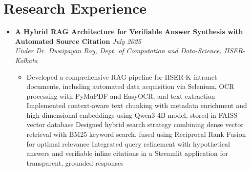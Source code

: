 \documentclass[a4paper,9pt]{article}
\newcommand{\resumeProject}[4]{
    \item\small{
        \textbf{#1} \hfill \textit{#2}\\
        \textit{#3}\\
        \begin{itemize}[leftmargin=1.5em,label=\textbullet,nosep,itemsep=0.5pt]
            #4
        \end{itemize}
    }\vspace{2pt}
}
\newcommand{\compactSection}[2]{
    \section{#1}
    \vspace{-0.1cm}
    #2
    \vspace{-0.2cm}
}
\begin{document}
\compactSection{Research Experience}{
\begin{itemize}[leftmargin=*,label={},itemsep=4pt]


    \resumeProject{A Hybrid RAG Architecture for Verifiable Answer Synthesis with Automated Source Citation}{July 2025}
    {Under Dr. Dwaipayan Roy, Dept. of Computation and Data-Science, IISER-Kolkata}
    {\item Developed a comprehensive RAG pipeline for IISER-K intranet documents, including automated data acquisition via Selenium, OCR processing with PyMuPDF and EasyOCR, and text extraction
    Implemented context-aware text chunking with metadata enrichment and high-dimensional embeddings using Qwen3-4B model, stored in FAISS vector database
     Designed hybrid search strategy combining dense vector retrieval with BM25 keyword search, fused using Reciprocal Rank Fusion for optimal relevance
    Integrated query refinement with hypothetical answers and verifiable inline citations in a Streamlit application for transparent, grounded responses}
     




\end{itemize}}
\end{document}
